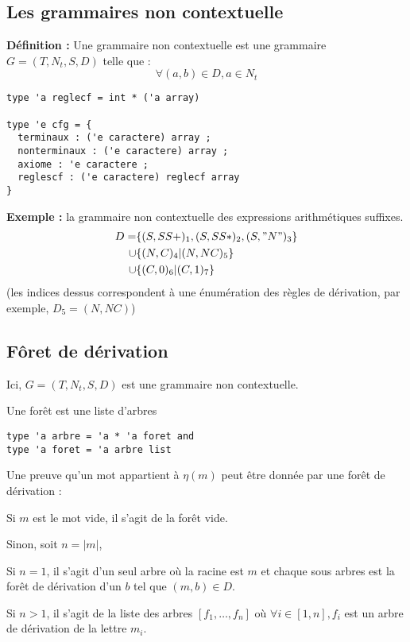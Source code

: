 \documentclass[a4paper,12pt]{article}
\newcommand{\norm}[1]{\lvert #1 \rvert}
\newlength{\mydepth}
\newlength{\myheight}
\newenvironment{answer}
{\par\begin{lrbox}{\mybox}\quad\begin{minipage}{\linewidth}\color{black}\setlength{\parskip}{10pt plus 1pt minus 1pt}\vspace*{-.7\baselineskip}}
{\end{minipage}\end{lrbox}
\settodepth{\mydepth}{\usebox{\mybox}}
\settoheight{\myheight}{\usebox{\mybox}}
\addtolength{\myheight}{\mydepth}
\noindent\makebox[0pt]{
  \color{gray}\hspace{-0pt}\rule[-\mydepth]{1pt}{\myheight}}
  \usebox{\mybox}
  }
\begin{document}
\subsection{Les grammaires non contextuelle}

\textbf{  Définition : } Une grammaire non contextuelle est une grammaire $G = (T,N_t,S,D)$ telle que :
\begin{equation*} \forall (a,b) \in D, a \in N_t  \end{equation*}


\begin{verbatim}
type 'a reglecf = int * ('a array)

type 'e cfg = {
  terminaux : ('e caractere) array ;
  nonterminaux : ('e caractere) array ;
  axiome : 'e caractere ;
  reglescf : ('e caractere) reglecf array
}
\end{verbatim}

\textbf{ Exemple : } la grammaire non contextuelle des expressions arithmétiques suffixes.
\begin{align*}
D = &\{(S,SS+)_1,(S,SS*)_2,(S,"N")_3\}\\
\cup&\{(N,C)_4 | (N,NC)_5\}\\
\cup&\{(C,0)_6 | (C,1)_7\}
\end{align*}
(les indices dessus correspondent à une énumération des règles de dérivation, par exemple, $D_5 = (N,NC)$)

\subsection{Fôret de dérivation}

Ici, $G = (T,N_t,S,D)$ est une grammaire non contextuelle.

Une forêt est une liste d'arbres
\begin{verbatim}
type 'a arbre = 'a * 'a foret and
type 'a foret = 'a arbre list
\end{verbatim}


Une preuve qu'un mot appartient à $\eta(m)$ peut être donnée par une forêt de dérivation :

\begin{answer} 
Si $m$ est le mot vide, il s'agit de la forêt vide.

Sinon, soit $n = \norm{m}$,\\
\begin{answer} 
    Si $n=1$, il s'agit d'un seul arbre où la racine est $m$ et chaque sous arbres est la forêt de dérivation d'un $b$ tel que $(m,b) \in D$.

    Si $n>1$, il s'agit de la liste des arbres $[f_1, \dots, f_n]$ où $\forall i \in [1,n], f_i$ est un arbre de dérivation de la lettre $m_i$.
\end{answer}
\end{answer}
\end{document}
